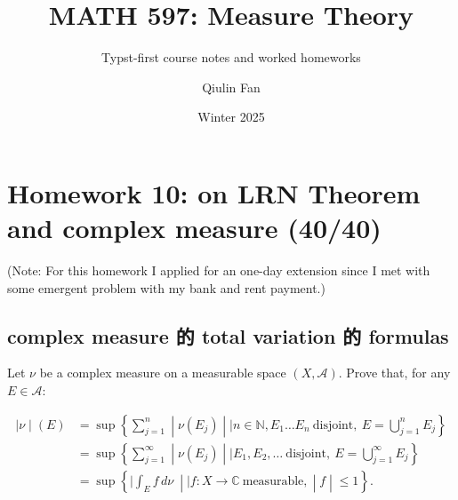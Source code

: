 \documentclass{qlnotes-export}
\title{MATH 597: Measure Theory}
\subtitle{Typst-first course notes and worked homeworks}
\author{Qiulin Fan}
\date{Winter 2025}
\begin{document}
\mainmatter
\chapter{Homework 10: on LRN Theorem and complex measure (40/40)}\label{homework-10-on-lrn-theorem-and-complex-measure-4040}

(Note: For this homework I applied for an one-day extension since I met with some emergent problem with my bank and rent payment.)

\section{complex measure 的 total variation 的 formulas}\label{complex-measure-ux7684-total-variation-ux7684-formulas}

Let \(\nu\) be a complex measure on a measurable space \((X,\mathcal{A})\). Prove that, for any \(E \in \mathcal{A}\):

\[\begin{matrix}
\left. |\nu \middle| (E) \right. & {= \sup\left\{ \sum\limits_{j = 1}^{n} \middle| \nu(E_{j}) \middle| \mid n \in {\mathbb{N}},E_{1}\ldots E_{n}\ \text{disjoint},\ E = \bigcup\limits_{j = 1}^{n}E_{j} \right\}} \\
 & {= \sup\left\{ \sum\limits_{j = 1}^{\infty} \middle| \nu(E_{j}) \middle| \mid E_{1},E_{2},\ldots\ \text{disjoint},\ E = \bigcup\limits_{j = 1}^{\infty}E_{j} \right\}} \\
 & {= \sup\left\{ |\int_{E}f\, d\nu\  \middle| \mid f:X\rightarrow{\mathbb{C}}\ \text{measurable}, \middle| f \middle| \leq 1 \right\}.}
\end{matrix}\]
\end{document}
